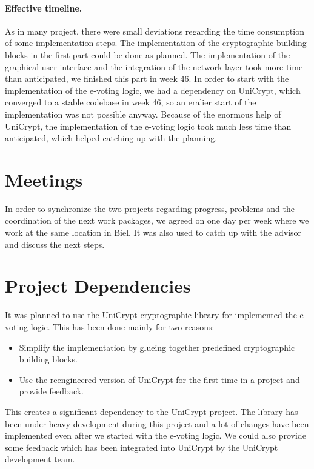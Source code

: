 \documentclass[numbers=noenddot, abstract=on, a4paper, headsepline,
footsepline, oneside, draft=off]{scrreprt}
\begin{document}
\paragraph{Effective timeline.} As in many project, there were small deviations
regarding the time consumption of some implementation steps. The implementation
of the cryptographic building blocks in the first part could be done as planned.
The implementation of the graphical user interface and the integration of the
network layer took more time than anticipated, we finished this part in week 46.
In order to start with the implementation of the e-voting logic, we had a
dependency on UniCrypt, which converged to a stable codebase in week 46, so an
eralier start of the implementation was not possible anyway. Because of the
enormous help of UniCrypt, the implementation of the e-voting logic took much
less time than anticipated, which helped catching up with the planning.

\section{Meetings}
In order to synchronize the two projects regarding progress, problems and the
coordination of the next work packages, we agreed on one day per week where we
work at the same location in Biel. It was also used to catch up with the advisor
and discuss the next steps.

\section{Project Dependencies}
It was planned to use the UniCrypt cryptographic library for implemented the
e-voting logic. This has been done mainly for two reasons:
\begin{itemize}
  \item Simplify the implementation by glueing together predefined cryptographic
  building blocks.
  \item Use the reengineered version of UniCrypt for the first time in a
  project and provide feedback.
\end{itemize}
This creates a significant dependency to the UniCrypt project. The library has
been under heavy development during this project and a lot of changes have been
implemented even after we started with the e-voting logic. We could also provide
some feedback which has been integrated into UniCrypt by the UniCrypt
development team.
\end{document}

